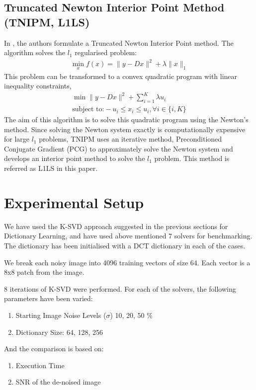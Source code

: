 \documentclass{article} %
\begin{document}
\subsection{Truncated Newton Interior Point Method (TNIPM, L1LS)}
In \cite{l1lskim2007efficient}, the authors formulate a Truncated Newton Interior Point method. The algorithm solves the $l_1$ regularised problem:
\begin{align}
\min_x f(x) = \|y - Dx\|^2 + \lambda\|x\|_1
\end{align}
This problem can be transformed to a convex quadratic program with linear inequality constraints,
\begin{align}
\min \|y - Dx\|^2 + \sum_{i= 1}^{K}\lambda u_i	\\
\text{subject to:} -u_i \leq x_i \leq u_i, \forall i \in \{i,K\}
\end{align}
The aim of this algorithm is to solve this quadratic program using the Newton's method. Since solving the Newton system exactly is computationally expensive for large $l_1$ problems, TNIPM uses an iterative method, Preconditioned Conjugate Gradient (PCG) to approximately solve the Newton system and develops an interior point method to solve the $l_1$ problem. This method is referred as L1LS in this paper.


\section{Experimental Setup}

We have used the K-SVD approach suggested in the previous sections for Dictionary Learning, and have used above mentioned 7 solvers for benchmarking.
The dictionary has been initialised with a DCT dictionary in each of the cases.

We break each noisy image into 4096 training vectors of size 64. Each vector is a $8$x$8$ patch from the image.  

8 iterations of K-SVD were performed.
For each of the solvers, the following parameters have been varied:
\begin{enumerate}
\item Starting Image Noise Levels ($\sigma$) 10, 20, 50 \%
\item Dictionary Size: 64, 128, 256
\end{enumerate}

And the comparison is based on:
\begin{enumerate}
\item Execution Time
\item SNR of the de-noised image
\end{enumerate}
\end{document}
